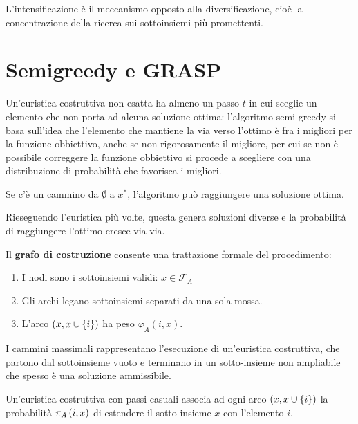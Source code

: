 \documentclass[\main/main.tex]{subfiles}
\providecommand{\f}{\mathcal{F}}
\providecommand{\fa}{\f_A}
\begin{document}
\begin{definition}[Intensificazione]
L'intensificazione è il meccanismo opposto alla diversificazione, cioè la concentrazione della ricerca sui sottoinsiemi più promettenti.
\end{definition}
\clearpage
\section{Semigreedy e GRASP}
\begin{multicols}{2}
\begin{observation}
    Un’euristica costruttiva non esatta ha almeno un passo \(t\) in cui sceglie un elemento che non porta ad alcuna soluzione ottima: l'algoritmo semi-greedy si basa sull'idea che l'elemento che mantiene la via verso l'ottimo è fra i migliori per la funzione obbiettivo, anche se non rigorosamente il migliore, per cui se non è possibile correggere la funzione obbiettivo si procede a scegliere con una distribuzione di probabilità che favorisca i migliori.
\end{observation}
\begin{property}
    Se c'è un cammino da \(\emptyset\) a \(x^*\), l'algoritmo può raggiungere una soluzione ottima.
\end{property}
\begin{property}
    Rieseguendo l'euristica più volte, questa genera soluzioni diverse e la probabilità di raggiungere l'ottimo cresce via via.
\end{property}
\begin{definition}
    Il \textbf{grafo di costruzione} consente una trattazione formale del procedimento:
    \begin{enumerate}
        \item I nodi sono i sottoinsiemi validi: \(x \in \fa\) %
        \item Gli archi legano sottoinsiemi separati da una sola mossa.
        \item L'arco \(\left(x, x \cup \left\{i\right\}\right)\) ha peso \(\varphi_A(i, x)\).
    \end{enumerate}
\end{definition}
\begin{observation}
I cammini massimali rappresentano l'esecuzione di un'euristica costruttiva, che partono dal sottoinsieme vuoto e terminano in un sotto-insieme non ampliabile che spesso è una soluzione ammissibile.
\end{observation}
\begin{observation}
    Un'euristica costruttiva con passi casuali associa ad ogni arco \(\left(x, x \cup \left\{i\right\}\right)\) la probabilità \(\pi_A\left(i, x\right)\) di estendere il sotto-insieme \(x\) con l'elemento \(i\).
    

\end{observation}
\end{multicols}
\end{document}
